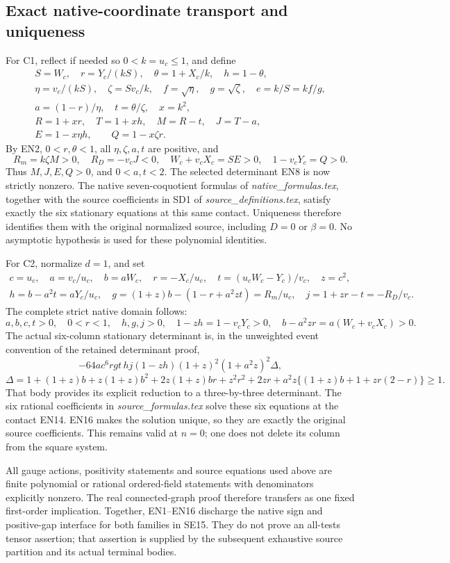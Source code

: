 \subsection{Exact native-coordinate transport and uniqueness}

For C1, reflect if needed so \(0<k=u_c\le1\), and define
\[
\begin{gathered}
 S=W_c,\quad r=Y_c/(kS),\quad
 \theta=1+X_c/k,\quad h=1-\theta,\\
 \eta=v_c/(kS),\quad \zeta=Sv_c/k,\quad
 f=\sqrt\eta,\quad g=\sqrt\zeta,\quad e=k/S=kf/g,\\
 a=(1-r)/\eta,\quad t=\theta/\zeta,\quad x=k^2,\\
 R=1+xr,\quad T=1+xh,\quad M=R-t,\quad J=T-a,\\
 E=1-x\eta h,\qquad Q=1-x\zeta r .
\end{gathered}\tag{EN13}
\]
By EN2, \(0<r,\theta<1\), all \(\eta,\zeta,a,t\) are positive,
and
\[
 R_m=k\zeta M>0,\quad R_D=-v_cJ<0,\quad
 W_c+v_cX_c=SE>0,\quad 1-v_cY_c=Q>0.
\]
Thus \(M,J,E,Q>0\), and \(0<a,t<2\).
The selected determinant EN8 is now strictly nonzero.  The native
seven-coquotient formulas of \emph{native\_formulas.tex}, together
with the source coefficients in SD1 of \emph{source\_definitions.tex},
satisfy exactly the six stationary equations at this same contact.
Uniqueness therefore identifies them with the original normalized
source, including \(D=0\) or \(\beta=0\).  No asymptotic hypothesis
is used for these polynomial identities.

For C2, normalize \(d=1\), and set
\[
\begin{gathered}
 c=u_c,\quad a=v_c/u_c,\quad b=aW_c,\quad r=-X_c/u_c,\quad
 t=(u_cW_c-Y_c)/v_c,\quad z=c^2,\\
 h=b-a^2t=aY_c/u_c,\quad
 g=(1+z)b-(1-r+a^2zt)=R_m/u_c,\quad
 j=1+zr-t=-R_D/v_c .
\end{gathered}\tag{EN14}
\]
The complete strict native domain follows:
\[
 a,b,c,t>0,\quad 0<r<1,\quad h,g,j>0,\quad
 1-zh=1-v_cY_c>0,\quad b-a^2zr=a(W_c+v_cX_c)>0.
 \tag{EN15}
\]
The actual six-column stationary determinant is, in the unweighted
event convention of the retained determinant proof,
\[
 -64ac^6rgt\,hj(1-zh)(1+z)^2(1+a^2z)^2\Delta,
\]
\[
 \Delta=1+(1+z)b+z(1+z)b^2+2z(1+z)br+z^2r^2+2zr
        +a^2z\{(1+z)b+1+zr(2-r)\}\ge1 .
 \tag{EN16}
\]
That body provides its explicit reduction to a three-by-three
determinant.  The six rational coefficients in
\emph{source\_formulas.tex} solve these six equations at the
contact EN14.  EN16 makes the solution unique, so they are exactly
the original source coefficients.  This remains valid at \(n=0\);
one does not delete its column from the square system.

All gauge actions, positivity statements and source equations used
above are finite polynomial or rational ordered-field statements
with denominators explicitly nonzero.  The real connected-graph
proof therefore transfers as one fixed first-order implication.
Together, EN1--EN16 discharge the native sign and positive-gap
interface for both families in SE15.  They do not prove an
all-tests tensor assertion; that assertion is supplied by the
subsequent exhaustive source partition and its actual terminal bodies.


